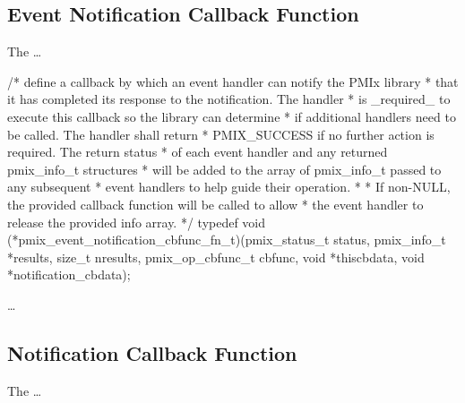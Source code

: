 \subsection{Event Notification Callback Function}

The  \ldots

\cspecificstart
\begin{codepar}
/* define a callback by which an event handler can notify the PMIx library
 * that it has completed its response to the notification. The handler
 * is _required_ to execute this callback so the library can determine
 * if additional handlers need to be called. The handler shall return
 * PMIX_SUCCESS if no further action is required. The return status
 * of each event handler and any returned pmix_info_t structures
 * will be added to the array of pmix_info_t passed to any subsequent
 * event handlers to help guide their operation.
 *
 * If non-NULL, the provided callback function will be called to allow
 * the event handler to release the provided info array.
 */
typedef void (*pmix_event_notification_cbfunc_fn_t)(pmix_status_t status,
                                                    pmix_info_t *results, size_t nresults,
                                                    pmix_op_cbfunc_t cbfunc, void *thiscbdata,
                                                    void *notification_cbdata);
\end{codepar}
\cspecificend

\descr

\ldots


\subsection{Notification Callback Function}

The  \ldots

